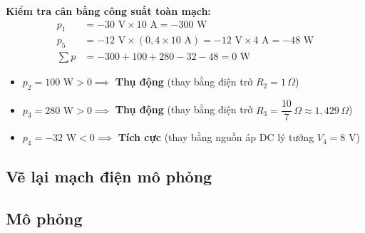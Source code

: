 \noindent\textbf{Kiểm tra cân bằng công suất toàn mạch:}
\begin{align*}
p_1 &= -30\text{ V} \times 10\text{ A} = -300\text{ W} \\
p_5 &= -12\text{ V} \times (0{,}4 \times 10\text{ A}) = -12\text{ V} \times 4\text{ A} = -48\text{ W} \\
\sum p &= -300 + 100 + 280 - 32 - 48 = 0\text{ W}
\end{align*}

\begin{dapsobox}
  \begin{itemize}[leftmargin=1.5em]
    \item $p_2 = 100\text{ W} > 0 \implies$ \textbf{Thụ động} (thay bằng điện trở $R_2 = 1\,\Omega$)
    \item $p_3 = 280\text{ W} > 0 \implies$ \textbf{Thụ động} (thay bằng điện trở $R_3 = \dfrac{10}{7}\,\Omega \approx 1{,}429\,\Omega$)
    \item $p_4 = -32\text{ W} < 0 \implies$ \textbf{Tích cực} (thay bằng nguồn áp DC lý tưởng $V_4 = 8\text{ V}$)
  \end{itemize}
\end{dapsobox}

\subsection{Vẽ lại mạch điện mô phỏng}

\subsection{Mô phỏng}
\simresult
{}
